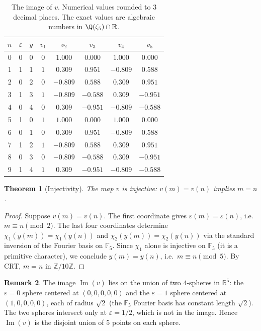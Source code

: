\documentclass[11pt,reqno]{amsart}
\newtheorem{theorem}{Theorem}[section]
\theoremstyle{definition}
\newtheorem{remark}[theorem]{Remark}
\newcommand{\Z}{\mathbb{Z}}
\newcommand{\R}{\mathbb{R}}
\newcommand{\F}{\mathbb{F}}
\DeclareMathOperator{\Img}{Im}
\begin{document}
\begin{table}[h]
\caption{The image of $v$. Numerical values rounded to $3$ decimal
places. The exact values are algebraic numbers in $\Q(\zeta_5) \cap
\R$.}
\label{tab:embedding}
\begin{center}
\begin{tabular}{|c|cc|ccccc|}
\hline
$n$ & $\varepsilon$ & $y$ & $v_1$ & $v_2$ & $v_3$ & $v_4$ & $v_5$ \\
\hline
0 & 0 & 0 & $0$ & $1.000$ & $0.000$ & $1.000$ & $0.000$ \\
1 & 1 & 1 & $1$ & $0.309$ & $0.951$ & $-0.809$ & $0.588$ \\
2 & 0 & 2 & $0$ & $-0.809$ & $0.588$ & $0.309$ & $0.951$ \\
3 & 1 & 3 & $1$ & $-0.809$ & $-0.588$ & $0.309$ & $-0.951$ \\
4 & 0 & 4 & $0$ & $0.309$ & $-0.951$ & $-0.809$ & $-0.588$ \\
5 & 1 & 0 & $1$ & $1.000$ & $0.000$ & $1.000$ & $0.000$ \\
6 & 0 & 1 & $0$ & $0.309$ & $0.951$ & $-0.809$ & $0.588$ \\
7 & 1 & 2 & $1$ & $-0.809$ & $0.588$ & $0.309$ & $0.951$ \\
8 & 0 & 3 & $0$ & $-0.809$ & $-0.588$ & $0.309$ & $-0.951$ \\
9 & 1 & 4 & $1$ & $0.309$ & $-0.951$ & $-0.809$ & $-0.588$ \\
\hline
\end{tabular}
\end{center}
\end{table}

\begin{theorem}[Injectivity]
\label{thm:injective}
The map $v$ is injective: $v(m) = v(n)$ implies $m = n$.
\end{theorem}

\begin{proof}
Suppose $v(m) = v(n)$. The first coordinate gives
$\varepsilon(m) = \varepsilon(n)$, i.e.\ $m \equiv n \pmod 2$. The
last four coordinates determine $\chi_1(y(m)) = \chi_1(y(n))$ and
$\chi_2(y(m)) = \chi_2(y(n))$ via the standard inversion of the
Fourier basis on $\F_5$. Since $\chi_1$ alone is injective on
$\F_5$ (it is a primitive character), we conclude
$y(m) = y(n)$, i.e.\ $m \equiv n \pmod 5$.
By CRT, $m = n$ in $\Z/10\Z$.
\end{proof}

\begin{remark}
\label{rem:dim}
The image $\Img(v)$ lies on the union of two $4$-spheres in $\R^5$:
the $\varepsilon = 0$ sphere centered at $(0,0,0,0,0)$ and the
$\varepsilon = 1$ sphere centered at $(1,0,0,0,0)$, each of radius
$\sqrt{2}$ (the $\F_5$ Fourier basis has constant length
$\sqrt{2}$). The two spheres intersect only at $\varepsilon = 1/2$,
which is not in the image. Hence $\Img(v)$ is the disjoint union of
$5$ points on each sphere.
\end{remark}
\end{document}
